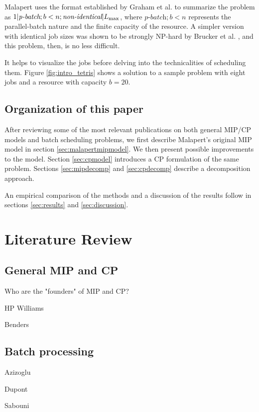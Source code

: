\documentclass[13pt, letterpaper, twoside]{book}
\begin{document}
Malapert uses the format established by Graham et al. \cite{graham_notation} to
summarize the problem as $1|\textit{p-batch}; b < n;
\textit{non-identical}|L_{\text{max}}$, where $\textit{p-batch};b<n$ represents the
parallel-batch nature and the finite capacity of the resource. A simpler version
with identical job sizes was shown to be strongly NP-hard by Brucker et al.
\cite{brucker}, and this problem, then, is no less difficult.

It helps to visualize the jobs before delving into the technicalities of
scheduling them. Figure \ref{fig:intro_tetris} shows a solution to a sample
problem with eight jobs and a resource with capacity $b = 20$.


\section{Organization of this paper}
After reviewing some of the most relevant publications on both general MIP/CP models and
batch scheduling problems, we first describe Malapert's original MIP model in
section \ref{sec:malapertmipmodel}. We then present possible improvements to the
model. Section \ref{sec:cpmodel} introduces a CP formulation of the same
problem. Sections \ref{sec:mipdecomp} and \ref{sec:cpdecomp} describe a
decomposition approach.

An empirical comparison of the methods and a discussion of the results follow in
sections \ref{sec:results} and \ref{sec:discussion}.

\chapter{Literature Review}
\section{General MIP and CP}
  \begin{alist}
    \item{Who are the "founders" of MIP and CP?}
    \item{HP Williams}
    \item{Benders}
  \end{alist}
\section{Batch processing}
\begin{alist}
    \item{Azizoglu}
    \item{Dupont}
    \item{Sabouni}
    \end{alist}
\end{document}
